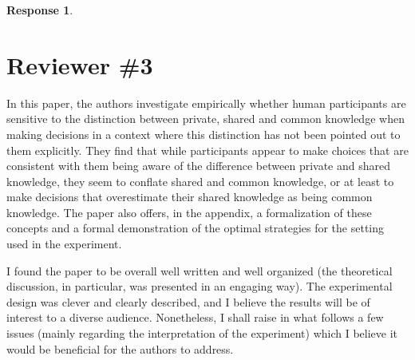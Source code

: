 \documentclass[a4paper]{article}
\newtheorem{response}{Response}
\newenvironment{robin}{\smallskip \noindent \color{red!10!green!50!blue}}{\color{black}\smallskip}
\newenvironment{tobo}{\smallskip \noindent \color{yellow!80!black!80}}{\color{black}\smallskip}
\begin{document}
\begin{response}



\end{response}


\section{Reviewer \#3}
 In this paper, the authors investigate empirically whether human participants are sensitive to the distinction between private, shared and common knowledge when making decisions in a context where this distinction has not been pointed out to them explicitly. They find that while participants appear to make choices that are consistent with them being aware of the difference between private and shared knowledge, they seem to conflate shared and common knowledge, or at least to make decisions that overestimate their shared knowledge as being common knowledge. The paper also offers, in the appendix, a formalization of these concepts and a formal demonstration of the optimal strategies for the setting used in the experiment.

I found the paper to be overall well written and well organized (the theoretical discussion, in particular, was presented in an engaging way). The experimental design was clever and clearly described, and I believe the results will be of interest to a diverse audience. Nonetheless, I shall raise in what follows a few issues (mainly regarding the interpretation of the experiment) which I believe it would be beneficial for the authors to address.
\end{document}
